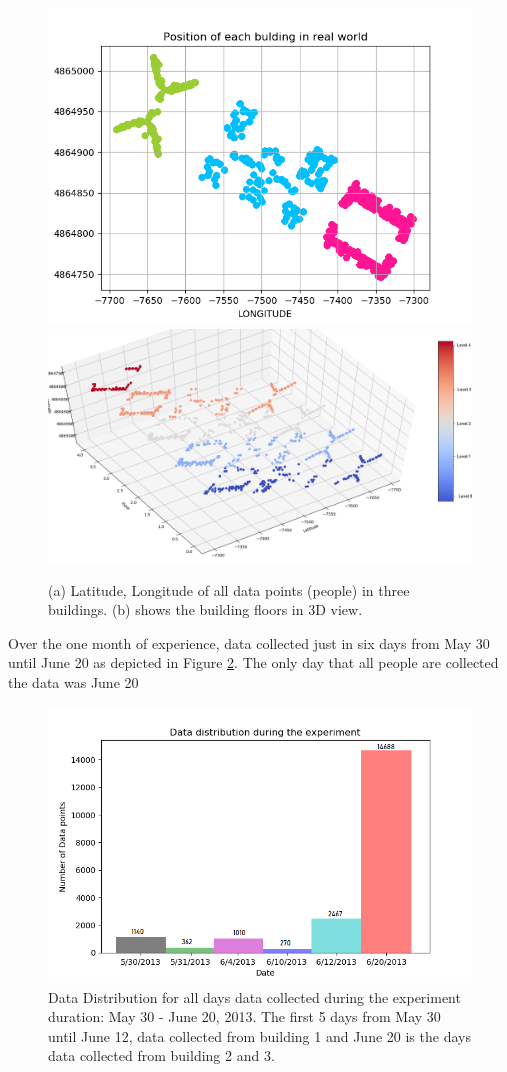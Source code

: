 \documentclass[../UNBThesis2.tex]{subfiles}
\begin{document}
\begin{figure}[!h]
    \centering
    \includegraphics[width = 7 cm]{image/Chapters/Chapter6/LatLong.png}\hfill
    \includegraphics[width = 8 cm]{image/Chapters/Chapter6/LatLongFloor.png}
    \\[\smallskipamount]    
    \caption{(a) Latitude, Longitude of all data points (people) in three buildings. (b) shows the building floors in 3D view.}
    \label{nama}
\end{figure}


Over the one month of experience, data collected just in six days from May 30 until June 20 as depicted in Figure \ref{timeline}. The only day that all people are collected the data was June 20



\begin{figure}
    \centering
    \includegraphics[width = 12 cm]{image/Chapters/Chapter6/timedist.png}
    \caption{Data Distribution for all days data collected during the experiment duration: May 30 - June 20, 2013. The first 5  days from May 30 until June 12, data collected from building 1 and June 20 is the days data collected from building 2 and 3.}
    \label{timeline}
\end{figure}
\end{document}
